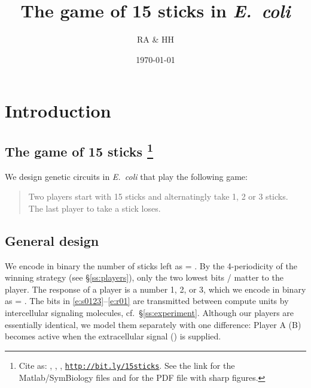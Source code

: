 \documentclass[12pt,notitlepage]{article}
\title{The game of 15 sticks in \emph{E.~coli}}
\author{RA \& HH}
\date{\today}
\def\[#1\]{\begin{align}#1\end{align}}
\newcommand{\linktodoc}{http://bit.ly/15sticks}
\begin{document}
\maketitle

\section{Introduction}

\subsection{The game of 15 sticks%
	\texorpdfstring{\footnote{%
		Cite as:
		\MyTitle, \MyAuthor, \MyDate,
		\href{\linktodoc}{{\texttt{\linktodoc}}}.
		See the link 
		for the Matlab/SymBiology files
		and 
		for the PDF file with sharp figures.
	}}{}%
}


We design genetic circuits
in \emph{E.~coli}
that play the following game:
%
\begin{quote}
	Two players start with 15 sticks
	and alternatingly 
	take 1, 2 or 3 sticks.
	\\
	The last player to take a stick loses.
\end{quote}



%



\subsection{General design} \label{s:general}

We encode in binary 
the number of sticks left as
\[
    \label{e:s0123}
     = 
    .
\]
%
%
By the 4-periodicity of the winning strategy
(see \S\ref{ss:players}),
only the two lowest bits /
matter to the player.
%
%
The response of a player is a number 1, 2, or 3,
which we encode in binary as
\[
    \label{e:r01}
     = 
    .
\]
%
The bits in \eqref{e:s0123}--\eqref{e:r01}
are transmitted 
between compute units
by 
intercellular signaling molecules,
cf.~\S\ref{ss:experiment}.
%
Although our players are essentially identical,
we model them separately with one difference:
Player A (B) becomes active when 
the extracellular signal  () is supplied.
\end{document}
